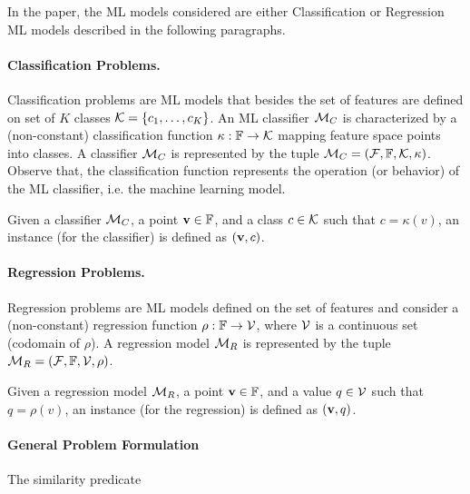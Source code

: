 In the paper, the ML models considered are either Classification or Regression ML models described in the following paragraphs.

\paragraph{Classification Problems.}

Classification problems are ML models that besides the set of features are defined on set of $K$ classes ${\mathcal{K}}=\{c_1,\ldots,c_K\}$.
%
An ML classifier ${\mathcal{M}}_C$ is characterized by a (non-constant) classification function $\kappa:\mathbb{F}\to{\mathcal{K}}$ mapping feature space points into classes.
%
A classifier ${\mathcal{M}}_C$ is represented by the tuple ${\mathcal{M}}_C=({\mathcal{F}}, \mathbb{F}, {\mathcal{K}}, \kappa)$.
%
Observe that, the classification function represents the operation (or behavior) of the ML classifier, i.e. the machine learning model.


Given a classifier ${\mathcal{M}}_C$, a point $\mathbf{v}\in\mathbb{F}$, and a class $c\in{\mathcal{K}}$ such that $c=\kappa(v)$, an instance (for the classifier) is defined as $(\mathbf{v},c)$.

\paragraph{Regression Problems.}

Regression problems are ML models defined on the set of features and consider a (non-constant) regression function $\rho:\mathbb{F}\to{\mathcal{V}}$, where ${\mathcal{V}}$ is a continuous set (codomain of $\rho$).
%
A regression model ${\mathcal{M}}_R$ is represented by the tuple ${\mathcal{M}}_R=({\mathcal{F}}, \mathbb{F}, {\mathcal{V}}, \rho)$.


Given a regression model ${\mathcal{M}}_R$, a point $\mathbf{v}\in\mathbb{F}$, and a value $q\in{\mathcal{V}}$ such that $q=\rho(v)$, an instance (for the regression) is defined as $(\mathbf{v},q)$.


\paragraph{General Problem Formulation}


The similarity predicate


